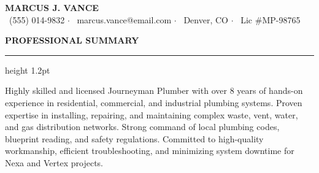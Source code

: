 \documentclass[10pt]{article}
\newcommand{\resumesection}[2]{%
  \vspace{6pt}
  \noindent
  {\color{primary}\large\bfseries #1\quad \MakeUppercase{#2}}
  \vspace{1pt}
  {\color{secondary}\hrule height 1.2pt}
  \vspace{3pt}
}
\begin{document}
\color{darktext}

\begin{center}
  {\Huge\bfseries\color{primary} MARCUS J. VANCE} \\
  \vspace{3pt}
  {\color{subtext}\small
    \faPhone\ (555) 014-9832 \quad $\cdot$ \quad
    \faEnvelope\ marcus.vance@email.com \quad $\cdot$ \quad
    \faMapMarker\ Denver, CO \quad $\cdot$ \quad
    \faCertificate\ Lic \#MP-98765
  }
\end{center}
\vspace{-8pt}

\resumesection{\faUser}{Professional Summary}
Highly skilled and licensed Journeyman Plumber with over 8 years of hands-on experience in residential, commercial, and industrial plumbing systems. Proven expertise in installing, repairing, and maintaining complex waste, vent, water, and gas distribution networks. Strong command of local plumbing codes, blueprint reading, and safety regulations. Committed to high-quality workmanship, efficient troubleshooting, and minimizing system downtime for Nexa and Vertex projects.
\end{document}
